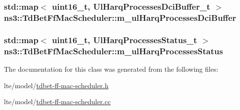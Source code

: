 \subsubsection[{\texorpdfstring{m\+\_\+ul\+Harq\+Processes\+Dci\+Buffer}{m_ulHarqProcessesDciBuffer}}]{\setlength{\rightskip}{0pt plus 5cm}std\+::map$<$ uint16\+\_\+t, {\bf Ul\+Harq\+Processes\+Dci\+Buffer\+\_\+t} $>$ ns3\+::\+Td\+Bet\+Ff\+Mac\+Scheduler\+::m\+\_\+ul\+Harq\+Processes\+Dci\+Buffer\hspace{0.3cm}{\ttfamily [private]}}\hypertarget{classns3_1_1TdBetFfMacScheduler_a24641ddb697d45df50ee7bcaaacdb1e1}{}\label{classns3_1_1TdBetFfMacScheduler_a24641ddb697d45df50ee7bcaaacdb1e1}
\subsubsection[{\texorpdfstring{m\+\_\+ul\+Harq\+Processes\+Status}{m_ulHarqProcessesStatus}}]{\setlength{\rightskip}{0pt plus 5cm}std\+::map$<$ uint16\+\_\+t, {\bf Ul\+Harq\+Processes\+Status\+\_\+t} $>$ ns3\+::\+Td\+Bet\+Ff\+Mac\+Scheduler\+::m\+\_\+ul\+Harq\+Processes\+Status\hspace{0.3cm}{\ttfamily [private]}}\hypertarget{classns3_1_1TdBetFfMacScheduler_a41bae8c97c560b2a314650d7e99bd356}{}\label{classns3_1_1TdBetFfMacScheduler_a41bae8c97c560b2a314650d7e99bd356}


The documentation for this class was generated from the following files\+:\begin{DoxyCompactItemize}
\item 
lte/model/\hyperlink{lte_2model_2tdbet-ff-mac-scheduler_8h}{tdbet-\/ff-\/mac-\/scheduler.\+h}\item 
lte/model/\hyperlink{lte_2model_2tdbet-ff-mac-scheduler_8cc}{tdbet-\/ff-\/mac-\/scheduler.\+cc}\end{DoxyCompactItemize}
